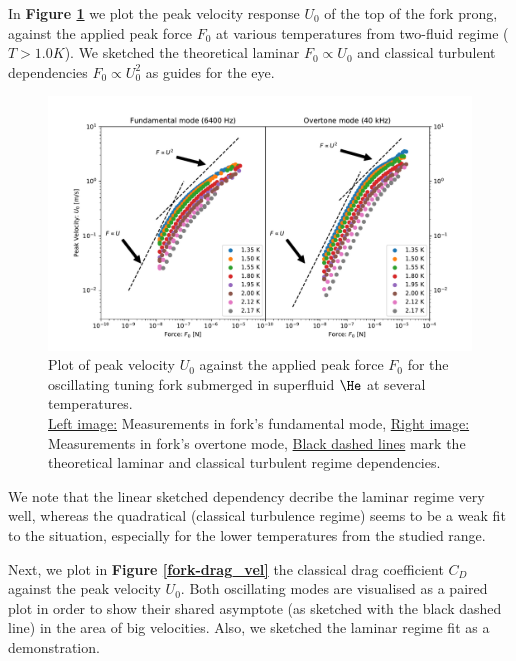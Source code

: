 \newpage

In \textbf{Figure \ref{fork-vel_force}} we plot the peak velocity response $U_0$ of the top of the fork prong, against the applied peak force $F_0$ at various temperatures from two-fluid regime ($T > 1.0\unit{K}$). We sketched the theoretical laminar $F_0 \propto U_0$ and classical turbulent dependencies $F_0 \propto U_0^2$ as guides for the eye.

\begin{figure}[h]
	\hspace{-1.7cm}
	\includegraphics[width=1.2\textwidth]{graphics/results/fork-vel_force}
	\caption{Plot of peak velocity $U_0$ against the applied peak force $F_0$ for the oscillating tuning fork submerged in superfluid $\He$ at several temperatures.\\
	\underline{Left image:} Measurements in fork's fundamental mode, \underline{Right image:} Measurements in fork's overtone mode, \underline{Black dashed lines} mark the theoretical laminar and classical turbulent regime dependencies.}
	\label{fork-vel_force}
\end{figure}

We note that the linear sketched dependency decribe the laminar regime very well, whereas the quadratical (classical turbulence regime) seems to be a weak fit to the situation, especially for the lower temperatures from the studied range.

Next, we plot in \textbf{Figure \ref{fork-drag_vel}} the classical drag coefficient $C_D$ against the peak velocity $U_0$. Both oscillating modes are visualised as a paired plot in order to show their shared asymptote (as sketched with the black dashed line) in the area of big velocities. Also, we sketched the laminar regime fit as a demonstration.

